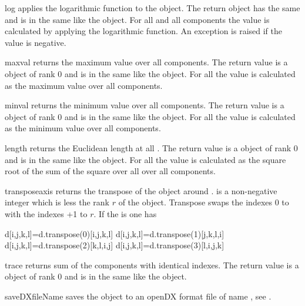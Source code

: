 \begin{methoddesc}[Data]{log}{}
applies the logarithmic function to the object. The
return \Data object has the same \Shape and is in the same
\FunctionSpace like the object. For all \DataSamplePoints and all
components the value is calculated by applying the logarithmic function. An exception is
raised if the value is negative.
\end{methoddesc}

\begin{methoddesc}[Data]{maxval}{}
returns the maximum value over all components. The
return value is a \Data object of rank 0 
and is in the same
\FunctionSpace like the object. For all \DataSamplePoints
the value is calculated as the maximum value over all components. 
\end{methoddesc}

\begin{methoddesc}[Data]{minval}{}
returns the minimum value over all components. The
return value is a \Data object of rank 0 
and is in the same
\FunctionSpace like the object. For all \DataSamplePoints
the value is calculated as the minimum value over all components. 
\end{methoddesc}

\begin{methoddesc}[Data]{length}{}
returns the Euclidean length at all \DataSamplePoints. The
return value is a \Data object of rank 0 
and is in the same
\FunctionSpace like the object. For all \DataSamplePoints
the value is calculated as the square root of the sum of the square over all over all components. 
\end{methoddesc}
\begin{methoddesc}[Data]{transpose}{axis}
returns the transpose of the object around .  is a non-negative integer
which is less the rank $r$ of the object. Transpose swaps the indexes $0$ to 
with the indexes +1 to $r$. If the  is \RankFour one has 
\begin{python}
d[i,j,k,l]=d.transpose(0)[i,j,k,l]
d[i,j,k,l]=d.transpose(1)[j,k,l,i]
d[i,j,k,l]=d.transpose(2)[k,l,i,j]
d[i,j,k,l]=d.transpose(3)[l,i,j,k]
\end{python}
\end{methoddesc}

\begin{methoddesc}[Data]{trace}{}
returns sum of the components with identical indexes. 
The
return value is a \Data object of rank 0 
and is in the same
\FunctionSpace like the object.
\end{methoddesc}
\begin{methoddesc}[Data]{saveDX}{fileName}
saves the object to an openDX format file of name , see
.  
\end{methoddesc}


